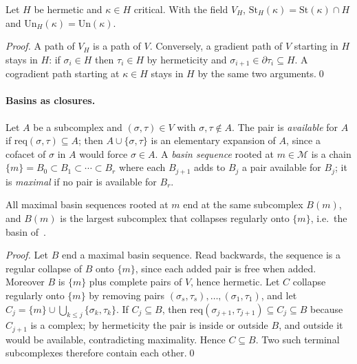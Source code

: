 \documentclass[runningheads]{llncs}
\newcommand{\St}{\mathrm{St}}
\newcommand{\Un}{\mathrm{Un}}
\newcommand{\req}{\mathrm{req}}
\begin{document}
\begin{theorem}[Restriction]\label{thm:restriction}
Let $H$ be hermetic and $\kappa\in H$ critical. With the field $V_H$,
$\St_H(\kappa)=\St(\kappa)\cap H$ and $\Un_H(\kappa)=\Un(\kappa)$.
\end{theorem}

\begin{proof}
A path of $V_H$ is a path of $V$. Conversely, a gradient path of $V$
starting in $H$ stays in $H$: if $\sigma_i\in H$ then $\tau_i\in H$ by
hermeticity and $\sigma_{i+1}\in\partial\tau_i\subseteq H$. A cogradient
path starting at $\kappa\in H$ stays in $H$ by the same two
arguments.\qed
\end{proof}

\paragraph{Basins as closures.}
Let $A$ be a subcomplex and $(\sigma,\tau)\in V$ with $\sigma,\tau\notin A$.
The pair is \emph{available} for $A$ if $\req(\sigma,\tau)\subseteq A$; then
$A\cup\{\sigma,\tau\}$ is an elementary expansion of $A$, since a cofacet of
$\sigma$ in $A$ would force $\sigma\in A$. A \emph{basin sequence} rooted at
$m\in\mathcal{M}$ is a chain $\{m\}=B_0\subset B_1\subset\cdots\subset B_r$
where each $B_{j+1}$ adds to $B_j$ a pair available for $B_j$; it is
\emph{maximal} if no pair is available for $B_r$.

\begin{theorem}[Closure]\label{thm:closure}
All maximal basin sequences rooted at $m$ end at the same subcomplex
$B(m)$, and $B(m)$ is the largest subcomplex that collapses regularly onto
$\{m\}$, i.e.\ the basin of~\cite{DFRS15}.
\end{theorem}

\begin{proof}
Let $B$ end a maximal basin sequence. Read backwards, the sequence is a
regular collapse of $B$ onto $\{m\}$, since each added pair is free when
added. Moreover $B$ is $\{m\}$ plus complete pairs of $V$, hence hermetic.
Let $C$ collapse regularly onto $\{m\}$ by removing pairs
$(\sigma_s,\tau_s),\ldots,(\sigma_1,\tau_1)$, and let
$C_j=\{m\}\cup\bigcup_{k\le j}\{\sigma_k,\tau_k\}$. If $C_j\subseteq B$,
then $\req(\sigma_{j+1},\tau_{j+1})\subseteq C_j\subseteq B$ because
$C_{j+1}$ is a complex; by hermeticity the pair is inside or outside $B$,
and outside it would be available, contradicting maximality. Hence
$C\subseteq B$. Two such terminal subcomplexes therefore contain each
other.\qed
\end{proof}
\end{document}
